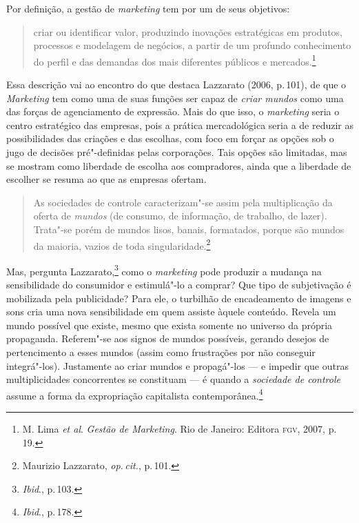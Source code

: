 Por definição, a gestão de \emph{marketing} tem por um de seus
objetivos:

\begin{quote}
criar ou identificar valor, produzindo inovações estratégicas em
produtos, processos e modelagem de negócios, a partir de um profundo
conhecimento do perfil e das demandas dos mais diferentes públicos e
mercados.\footnote{M. Lima \emph{et al}. \emph{Gestão de Marketing}. Rio de Janeiro: Editora
\textsc{fgv}, 2007, p.\,19.}
\end{quote}

Essa descrição vai ao encontro do que destaca Lazzarato (2006, p.\,101),
de que o \emph{Marketing} tem como uma de suas funções ser capaz de
\emph{criar mundos} como uma das forças de agenciamento de expressão.
Mais do que isso, o \emph{marketing} seria o centro estratégico das
empresas, pois a prática mercadológica seria a de reduzir as
possibilidades das criações e das escolhas, com foco em forçar as opções
sob o jugo de decisões pré"-definidas pelas corporações. Tais opções são
limitadas, mas se mostram como liberdade de escolha aos compradores, ainda que
a liberdade de escolher se resuma ao que as empresas ofertam.

\begin{quote}
As sociedades de controle caracterizam"-se assim pela multiplicação da
oferta de \emph{mundos} (de consumo, de informação, de trabalho, de lazer).
Trata"-se porém de mundos lisos, banais, formatados, porque são mundos da
maioria, vazios de toda singularidade.\footnote{Maurizio Lazzarato, \textit{op.\,cit.}, p.\,101.}
\end{quote}

Mas, pergunta Lazzarato,\footnote{\textit{Ibid}., p.\,103.} como o \emph{marketing} pode
produzir a mudança na sensibilidade do consumidor e estimulá"-lo a
comprar? Que tipo de subjetivação é mobilizada pela publicidade? Para
ele, o turbilhão de encadeamento de imagens e sons cria uma nova
sensibilidade em quem assiste àquele conteúdo. Revela um mundo possível
que existe, mesmo que exista somente no universo da própria propaganda.
Referem"-se aos signos de mundos possíveis, gerando desejos de
pertencimento a esses mundos (assim como frustrações por não conseguir
integrá"-los). Justamente ao criar mundos e propagá"-los --- e impedir que
outras multiplicidades concorrentes se constituam --- é quando a
\emph{sociedade de controle} assume a forma da expropriação capitalista
contemporânea.\footnote{\textit{Ibid}., p.\,178.}

